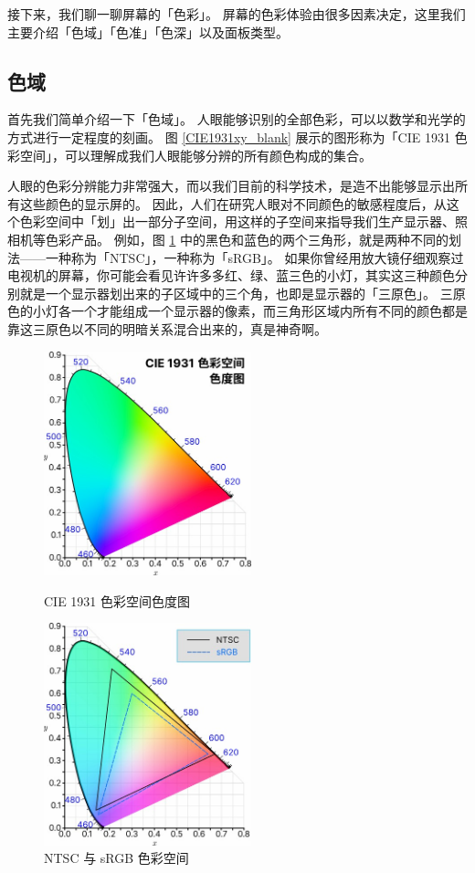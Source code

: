 接下来，我们聊一聊屏幕的「色彩」。
屏幕的色彩体验由很多因素决定，这里我们主要介绍「色域」「色准」「色深」以及面板类型。

\subsection{色域}

首先我们简单介绍一下「色域」。
人眼能够识别的全部色彩，可以以数学和光学的方式进行一定程度的刻画。
图 \ref{CIE1931xy_blank} 展示的图形称为「CIE 1931 色彩空间」，可以理解成我们人眼能够分辨的所有颜色构成的集合。

人眼的色彩分辨能力非常强大，而以我们目前的科学技术，是造不出能够显示出所有这些颜色的显示屏的。
因此，人们在研究人眼对不同颜色的敏感程度后，从这个色彩空间中「划」出一部分子空间，用这样的子空间来指导我们生产显示器、照相机等色彩产品。
例如，图 \ref{NTSC_sRGB} 中的黑色和蓝色的两个三角形，就是两种不同的划法——一种称为「NTSC」，一种称为「sRGB」。
如果你曾经用放大镜仔细观察过电视机的屏幕，你可能会看见许许多多红、绿、蓝三色的小灯，其实这三种颜色分别就是一个显示器划出来的子区域中的三个角，也即是显示器的「三原色」。
三原色的小灯各一个才能组成一个显示器的像素，而三角形区域内所有不同的颜色都是靠这三原色以不同的明暗关系混合出来的，真是神奇啊。

\begin{figure}[htb!]
  \begin{minipage}{6.5cm}
    \centering
    \includegraphics[width=6cm]{assets/CIE1931xy_blank.jpg}
    \caption{CIE 1931 色彩空间色度图}
    \label{CIE1931xy_blank}
  \end{minipage}
  \qquad
  \begin{minipage}{6.5cm}
  \centering
  \includegraphics[width=6cm]{assets/NTSC_sRGB.jpg}
  \caption{NTSC 与 sRGB 色彩空间}
  \label{NTSC_sRGB}
  \end{minipage}
\end{figure}


